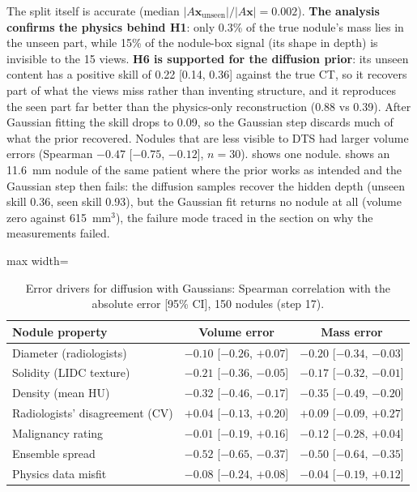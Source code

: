 The split itself is accurate (median $|A\mathbf{x}_{\text{unseen}}|/|A\mathbf{x}| = 0.002$). \textbf{The analysis confirms the physics behind H1}: only 0.3\% of the true nodule's mass lies in the unseen part, while 15\% of the nodule-box signal (its shape in depth) is invisible to the 15 views. \textbf{H6 is supported for the diffusion prior}: its unseen content has a positive skill of 0.22 [0.14, 0.36] against the true CT, so it recovers part of what the views miss rather than inventing structure, and it reproduces the seen part far better than the physics-only reconstruction (0.88 vs 0.39). After Gaussian fitting the skill drops to 0.09, so the Gaussian step discards much of what the prior recovered. Nodules that are less visible to DTS had larger volume errors (Spearman $-0.47$ [$-0.75$, $-0.12$], $n=30$).  shows one nodule.  shows an 11.6~mm nodule of the same patient where the prior works as intended and the Gaussian step then fails: the diffusion samples recover the hidden depth (unseen skill 0.36, seen skill 0.93), but the Gaussian fit returns no nodule at all (volume zero against 615~mm$^3$), the failure mode traced in the section on why the measurements failed.

\begin{table}[!htbp]
\centering\small
\caption{Error drivers for diffusion with Gaussians: Spearman correlation with the absolute error [95\% CI], 150 nodules (step 17).}
\label{tab:drivers}
\begin{adjustbox}{max width=\linewidth}
\begin{tabular}{lcc}
\toprule
Nodule property & Volume error & Mass error \\
\midrule
Diameter (radiologists) & $-0.10$ [$-0.26$, $+0.07$] & $-0.20$ [$-0.34$, $-0.03$] \\
Solidity (LIDC texture) & $-0.21$ [$-0.36$, $-0.05$] & $-0.17$ [$-0.32$, $-0.01$] \\
Density (mean HU) & $-0.32$ [$-0.46$, $-0.17$] & $-0.35$ [$-0.49$, $-0.20$] \\
Radiologists' disagreement (CV) & $+0.04$ [$-0.13$, $+0.20$] & $+0.09$ [$-0.09$, $+0.27$] \\
Malignancy rating & $-0.01$ [$-0.19$, $+0.16$] & $-0.12$ [$-0.28$, $+0.04$] \\
Ensemble spread & $\mathbf{-0.52}$ [$-0.65$, $-0.37$] & $\mathbf{-0.50}$ [$-0.64$, $-0.35$] \\
Physics data misfit & $-0.08$ [$-0.24$, $+0.08$] & $-0.04$ [$-0.19$, $+0.12$] \\
\bottomrule
\end{tabular}
\end{adjustbox}
\end{table}

